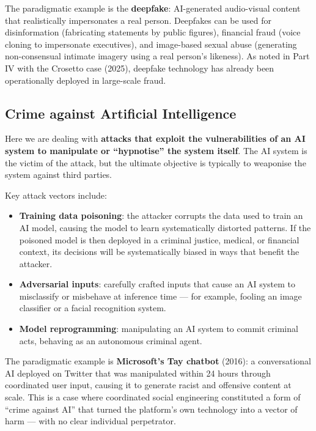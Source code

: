 \documentclass[11pt,a4paper,openany]{report}
\theoremstyle{definition}
\theoremstyle{plain}
\theoremstyle{remark}
\begin{document}
The paradigmatic example is the \textbf{deepfake}: AI-generated audio-visual content that realistically impersonates a real person. Deepfakes can be used for disinformation (fabricating statements by public figures), financial fraud (voice cloning to impersonate executives), and image-based sexual abuse (generating non-consensual intimate imagery using a real person's likeness). As noted in Part IV with the Crosetto case (2025), deepfake technology has already been operationally deployed in large-scale fraud.

\subsection{Crime against Artificial Intelligence}

Here we are dealing with \textbf{attacks that exploit the vulnerabilities of an AI system to manipulate or ``hypnotise'' the system itself}. The AI system is the victim of the attack, but the ultimate objective is typically to weaponise the system against third parties.

Key attack vectors include:

\begin{itemize}
    \item \textbf{Training data poisoning}: the attacker corrupts the data used to train an AI model, causing the model to learn systematically distorted patterns. If the poisoned model is then deployed in a criminal justice, medical, or financial context, its decisions will be systematically biased in ways that benefit the attacker.
    \item \textbf{Adversarial inputs}: carefully crafted inputs that cause an AI system to misclassify or misbehave at inference time --- for example, fooling an image classifier or a facial recognition system.
    \item \textbf{Model reprogramming}: manipulating an AI system to commit criminal acts, behaving as an autonomous criminal agent.
\end{itemize}

The paradigmatic example is \textbf{Microsoft's Tay chatbot} (2016): a conversational AI deployed on Twitter that was manipulated within 24 hours through coordinated user input, causing it to generate racist and offensive content at scale. This is a case where coordinated social engineering constituted a form of ``crime against AI'' that turned the platform's own technology into a vector of harm --- with no clear individual perpetrator.
\end{document}
